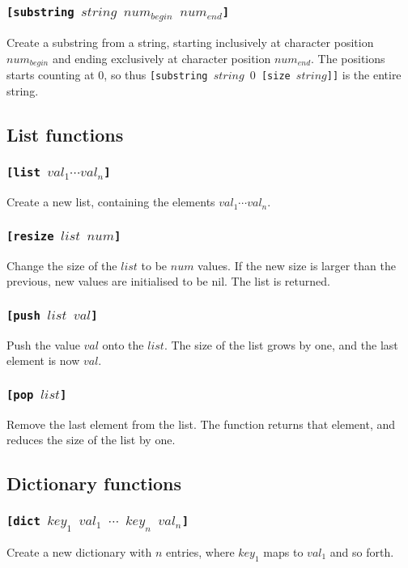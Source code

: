 \subsubsection{\tt{[substring }$string$ $num_{begin}$ $num_{end}$\tt{]}}
Create a substring from a string, starting inclusively at character position $num_{begin}$ and ending exclusively at character position $num_{end}$. The positions starts counting at $0$, so thus {\tt{[substring }$string$ $0$ \tt{[size }$string$\tt{]]}} is the entire string.

\subsection{List functions}
\subsubsection{\tt{[list }$val_1\cdots val_n$\tt{]}}
Create a new list, containing the elements $val_1\cdots val_n$.

\subsubsection{\tt{[resize }$list$ $num$\tt{]}}
Change the size of the $list$ to be $num$ values. If the new size is larger than the previous, new values are initialised to be nil. The list is returned.

\subsubsection{\tt{[push }$list$ $val$\tt{]}}
Push the value $val$ onto the $list$. The size of the list grows by one, and the last element is now $val$.

\subsubsection{\tt{[pop }$list$\tt{]}}
Remove the last element from the list. The function returns that element, and reduces the size of the list by one.

\subsection{Dictionary functions}
\subsubsection{\tt{[dict }$key_1$  $val_1$ $\cdots$ $key_n$ $val_n$\tt{]}}
Create a new dictionary with $n$ entries, where $key_1$ maps to $val_1$ and so forth.

